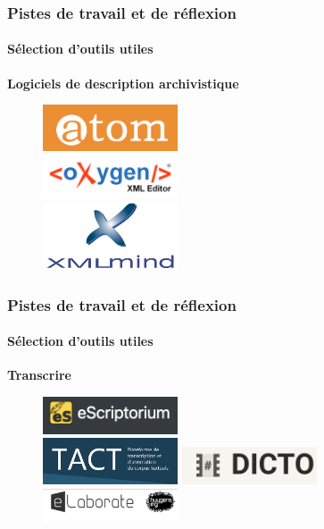 \documentclass[xcolor=table]{beamer}
\begin{document}
\begin{frame}[plain]
\frametitle{Pistes de travail et de r\'eflexion}
\framesubtitle{S\'election d'outils utiles}
\textbf{Logiciels de description archivistique}
\begin{figure}[!]
\includegraphics[width=4cm]{images/atom-logo.png} \\
\includegraphics[width=4cm]{images/oxygen-logo.png}\\
\includegraphics[width=4cm]{images/xmlmind-logo.png}
\end{figure}
\end{frame}

\begin{frame}[plain]
\frametitle{Pistes de travail et de r\'eflexion}
\framesubtitle{S\'election d'outils utiles}
\textbf{Transcrire}
\begin{figure}[!]
\includegraphics[width=4cm]{images/escriptorium-logo.png} \\
\includegraphics[width=4cm]{images/tact-logo.png}
\includegraphics[width=4cm]{images/dicto-logo.png}
\includegraphics[width=4cm]{images/elaborate-logo.png}
\end{figure}
\end{frame}
\end{document}
